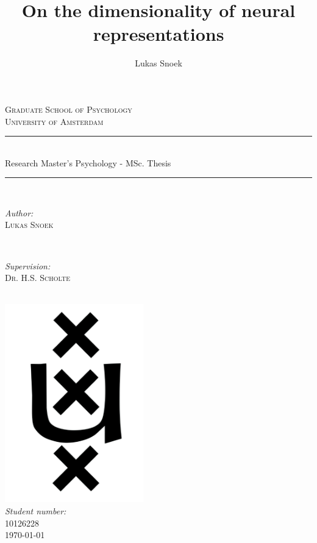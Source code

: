 \documentclass[jou,12pt,a4paper]{apa6}
\title{\LARGE On the dimensionality of neural representations}
\author{Lukas Snoek}
\affiliation{University of Amsterdam}
\begin{document}

\begin{titlepage}

\newcommand{\HRule}{\rule{\linewidth}{0.5mm}} 
\center 

\textsc{\LARGE Graduate School of Psychology}\\[1cm] 
\textsc{\Large University of Amsterdam}\\[1cm]

\HRule \\[0.4cm]
{ \huge Research Master's Psychology - MSc. Thesis}\\[0.2cm] 
\HRule \\[1.5cm]

\begin{minipage}{0.4\textwidth}
\begin{flushleft} \large
\emph{Author:}\\
\textsc{Lukas Snoek}  
\end{flushleft}
\end{minipage}
~
\begin{minipage}{0.4\textwidth}
\begin{flushright} \large
\emph{Supervision:} \\
\textsc{Dr. H.S. Scholte} 
\end{flushright}
\end{minipage}\\[1cm]

\includegraphics[width=60mm]{uva_logo_inv}\\[1cm] 

\large \emph{Student number:} \\ 
10126228 \\[1cm]
\LARGE {\today}\\[2cm]

\vfill 

\end{titlepage}
\end{document}
